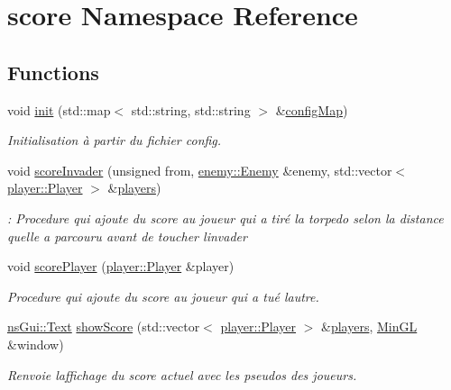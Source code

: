 \hypertarget{namespacescore}{}\section{score Namespace Reference}
\label{namespacescore}
\subsection*{Functions}
\begin{DoxyCompactItemize}
\item 
void \hyperlink{namespacescore_af95066a9c5dff49a5a9d5ee29f162757}{init} (std\+::map$<$ std\+::string, std\+::string $>$ \&\hyperlink{main_8cpp_ada2160bcc2082e595d02f0eb5a318dd5}{config\+Map})
\begin{DoxyCompactList}\small\item\em Initialisation à partir du fichier config. \end{DoxyCompactList}\item 
void \hyperlink{namespacescore_a53974e9c6b708076269b611addd8eed1}{score\+Invader} (unsigned from, \hyperlink{structenemy_1_1_enemy}{enemy\+::\+Enemy} \&enemy, std\+::vector$<$ \hyperlink{structplayer_1_1_player}{player\+::\+Player} $>$ \&\hyperlink{multi_8cpp_abd9de51dc9a6f90588878ff69cec449d}{players})
\begin{DoxyCompactList}\small\item\em \+: Procedure qui ajoute du score au joueur qui a tiré la torpedo selon la distance qu\textquotesingle{}elle a parcouru avant de toucher l\textquotesingle{}invader \end{DoxyCompactList}\item 
void \hyperlink{namespacescore_aebc7be40ef0cc33800d763aec5e626a0}{score\+Player} (\hyperlink{structplayer_1_1_player}{player\+::\+Player} \&player)
\begin{DoxyCompactList}\small\item\em Procedure qui ajoute du score au joueur qui a tué l\textquotesingle{}autre. \end{DoxyCompactList}\item 
\hyperlink{classns_gui_1_1_text}{ns\+Gui\+::\+Text} \hyperlink{namespacescore_a71e5d3a50d1f96c3c5ff1155b3d5fdbb}{show\+Score} (std\+::vector$<$ \hyperlink{structplayer_1_1_player}{player\+::\+Player} $>$ \&\hyperlink{multi_8cpp_abd9de51dc9a6f90588878ff69cec449d}{players}, \hyperlink{class_min_g_l}{Min\+GL} \&window)
\begin{DoxyCompactList}\small\item\em Renvoie l\textquotesingle{}affichage du score actuel avec les pseudos des joueurs. \end{DoxyCompactList}\item 

\end{DoxyCompactItemize}
